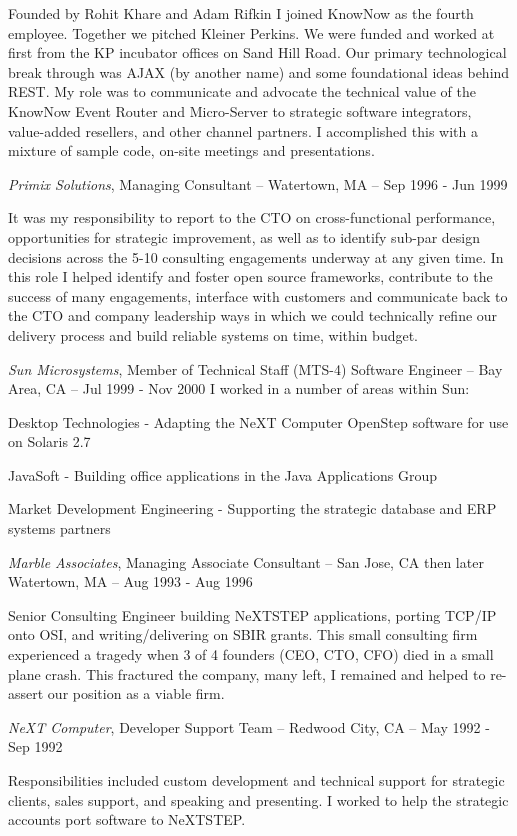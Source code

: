 \documentclass[letterpaper]{article}
\renewenvironment{itemize}{
  \begin{list}{}{
    \setlength{\leftmargin}{1.5em}
  }
}{
  \end{list}
}
\begin{document}
\begin{itemize}
Founded by Rohit Khare and Adam Rifkin I joined KnowNow as the fourth
employee. Together we pitched Kleiner Perkins. We were funded and worked at
first from the KP incubator offices on Sand Hill Road. Our primary
technological break through was AJAX (by another name) and some foundational
ideas behind REST. My role was to communicate and advocate the technical value
of the KnowNow Event Router and Micro-Server to strategic software integrators,
value-added resellers, and other channel partners. I accomplished this with a
mixture of sample code, on-site meetings and presentations.

\item {\it Primix Solutions}, Managing Consultant -- Watertown, MA -- Sep 1996 - Jun 1999

It was my responsibility to report to the CTO on cross-functional performance,
opportunities for strategic improvement, as well as to identify sub-par design
decisions across the 5-10 consulting engagements underway at any given time. In
this role I helped identify and foster open source frameworks, contribute to
the success of many engagements, interface with customers and communicate back
to the CTO and company leadership ways in which we could technically refine our
delivery process and build reliable systems on time, within budget.

\item {\it Sun Microsystems}, Member of Technical Staff (MTS-4) Software Engineer -- Bay Area, CA -- Jul 1999 - Nov 2000
I worked in a number of areas within Sun:
\begin{itemize}
\item Desktop Technologies - Adapting the NeXT Computer OpenStep software for use on Solaris 2.7
\item JavaSoft - Building office applications in the Java Applications Group
\item Market Development Engineering - Supporting the strategic database and ERP systems partners
\end{itemize}

\item {\it Marble Associates}, Managing Associate Consultant -- San Jose, CA then later Watertown, MA -- Aug 1993 - Aug 1996

Senior Consulting Engineer building NeXTSTEP applications, porting TCP/IP onto
OSI, and writing/delivering on SBIR grants. This small consulting firm
experienced a tragedy when 3 of 4 founders (CEO, CTO, CFO) died in a small
plane crash. This fractured the company, many left, I remained and helped to
re-assert our position as a viable firm.

\item {\it NeXT Computer}, Developer Support Team -- Redwood City, CA -- May 1992 - Sep 1992

Responsibilities included custom development and technical support for
strategic clients, sales support, and speaking and presenting. I worked to help
the strategic accounts port software to NeXTSTEP.
\end{itemize}
\end{document}
